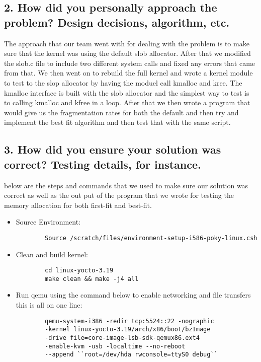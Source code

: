 \documentclass[onecolumn, draftclsnofoot,10pt, compsoc]{IEEEtran}
\begin{document}
	\subsection*{2. How did you personally approach the problem? Design decisions, algorithm, etc.}
	\noindent The approach that our team went with for dealing with the problem is to make sure that the kernel was using 
	the default slob allocator. After that we modified the slob.c file to  include two different system calls and fixed any errors that 
	came from that. We then went on to rebuild the full kernel and wrote a kernel module to test to the  slop allocator by having the moduel 
	call kmalloc and kree. The kmalloc interface is built with the slob allocator and the simplest way to test is to
	calling kmalloc and kfree in a loop. After that we then wrote a program that would give us the fragmentation rates for both 
	the default and then try and implement the best fit algorithm and then test that with the same script. 


	\subsection*{3. How did you ensure your solution was correct? Testing details, for instance.}
	\noindent below are the steps and commands that we used to make sure our solution was correct as well as the 
	out put of the program that we wrote for testing the memory allocation for both first-fit and best-fit. 


	\begin{itemize}

	\item Source Environment:
		\begin{lstlisting}
		Source /scratch/files/environment-setup-i586-poky-linux.csh
		\end{lstlisting}
	
	\item Clean and build kernel: 
		\begin{lstlisting}
		cd linux-yocto-3.19
		make clean && make -j4 all
		\end{lstlisting}

	\item Run qemu using the command below to enable networking and file transfers this is all on one line:
		\begin{lstlisting}
		qemu-system-i386 -redir tcp:5524::22 -nographic 
		-kernel linux-yocto-3.19/arch/x86/boot/bzImage 
		-drive file=core-image-lsb-sdk-qemux86.ext4 
		-enable-kvm -usb -localtime --no-reboot 
		--append ``root=/dev/hda rwconsole=ttyS0 debug``
		\end{lstlisting}
\end{itemize}
\end{document}
